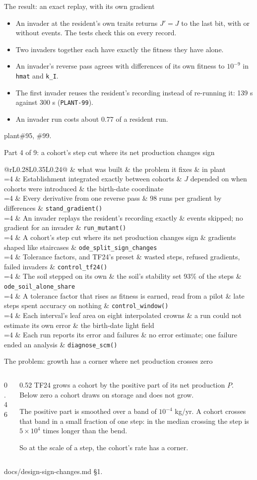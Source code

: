 \documentclass[aspectratio=169,10pt]{beamer}
\makeatletter
\newcommand{\src}[1]{\par\vfill{\tiny\color{quiet} #1}}
\newcommand{\rmrow}[4]{%
  \ifnum#1=\rmcurrent \rowcolor{wash}\fi
  #1 & #2 & #3 & #4 \\}
\newcommand{\roadmap}[1]{%
  \def\rmcurrent{#1}%
  \footnotesize
  \begin{tabular}{@{}rL{0.28\textwidth}L{0.35\textwidth}L{0.24\textwidth}@{}}
    \toprule
    & what was built & the problem it fixes & in plant \\
    \midrule
    \rmrow{1}{Establishment integrated exactly between cohorts}{$J$ depended on when cohorts were introduced}{the birth-date coordinate}
    \rmrow{2}{Every derivative from one reverse pass}{98 runs per gradient by differences}{\texttt{stand\_gradient()}}
    \rmrow{3}{An invader replays the resident's recording exactly}{events skipped; no gradient for an invader}{\texttt{run\_mutant()}}
    \rmrow{4}{A cohort's step cut where its net production changes sign}{gradients shaped like staircases}{\texttt{ode\_split\_sign\_changes}}
    \rmrow{5}{Tolerance factors, and TF24's preset}{wasted steps, refused gradients, failed invaders}{\texttt{control\_tf24()}}
    \rmrow{6}{The soil stepped on its own}{the soil's stability set 93\% of the steps}{\texttt{ode\_soil\_alone\_share}}
    \rmrow{7}{A tolerance factor that rises as fitness is earned, read from a pilot}{late steps spent accuracy on nothing}{\texttt{control\_window()}}
    \rmrow{8}{Each interval's leaf area on eight interpolated crowns}{a run could not estimate its own error}{the birth-date light field}
    \rmrow{9}{Each run reports its error and failures}{no error estimate; one failure ended an analysis}{\texttt{diagnose\_scm()}}
    \bottomrule
  \end{tabular}}
\makeatother
\begin{document}
\begin{frame}{The result: an exact replay, with its own gradient}
  \small
  \begin{itemize}
    \item An invader at the resident's own traits returns $J' = J$ to the last bit, with or
      without events. The tests check this on every record.
    \item Two invaders together each have exactly the fitness they have alone.
    \item An invader's reverse pass agrees with differences of its own fitness to $10^{-9}$ in
      \texttt{hmat} and \texttt{k\_I}.
    \item The first invader reuses the resident's recording instead of re-running it: 139 s
      against 300 s (\texttt{PLANT-99}).
    \item An invader run costs about 0.77 of a resident run.
  \end{itemize}
  \src{plant\#95, \#99.}
\end{frame}

\begin{frame}{Part 4 of 9: a cohort's step cut where its net production changes sign}
  \roadmap{4}
\end{frame}

\begin{frame}{The problem: growth has a corner where net production crosses zero}
  \begin{columns}[T]
    \begin{column}{0.46\textwidth}
    \end{column}
    \begin{column}{0.52\textwidth}
      \small
      TF24 grows a cohort by the positive part of its net production $P$. Below zero a cohort
      draws on storage and does not grow.
      \medskip

      The positive part is smoothed over a band of $10^{-4}$ kg/yr. A cohort crosses that band
      in a small fraction of one step: in the median crossing the step is $5\times10^4$ times
      longer than the bend.
      \medskip

      So at the scale of a step, the cohort's rate has a corner.
    \end{column}
  \end{columns}
  \src{docs/design-sign-changes.md \S1.}
\end{frame}
\end{document}
